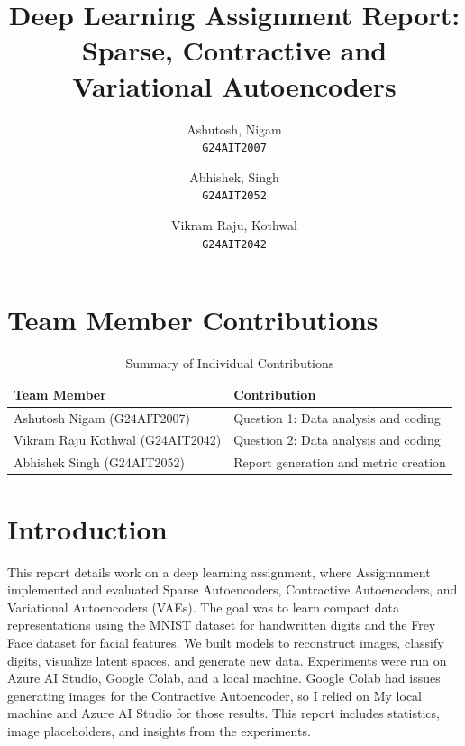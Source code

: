 \documentclass[12pt]{article}
\title{Deep Learning Assignment Report: Sparse, Contractive and Variational Autoencoders}
\author{
	Ashutosh, Nigam\\
	\texttt{G24AIT2007}
	\and
	Abhishek, Singh\\
	\texttt{G24AIT2052}
	\and
	Vikram Raju, Kothwal\\
	\texttt{G24AIT2042}
}
\date{}
\begin{document}
\newpage
\maketitle

\section*{Team Member Contributions}

\begin{table}[h!]
\centering
\begin{tabular}{@{}ll@{}}
\toprule
\textbf{Team Member} & \textbf{Contribution} \\
\midrule
Ashutosh Nigam (G24AIT2007) & Question 1: Data analysis and coding \\
Vikram Raju Kothwal (G24AIT2042) & Question 2: Data analysis and coding \\
Abhishek Singh (G24AIT2052) & Report generation and metric creation \\
\bottomrule
\end{tabular}
\caption{Summary of Individual Contributions}
\end{table}

	\section{Introduction}
	This report details  work on a deep learning assignment, where Assigmnment implemented and evaluated Sparse Autoencoders, Contractive Autoencoders, and Variational Autoencoders (VAEs). The goal was to learn compact data representations using the MNIST dataset for handwritten digits and the Frey Face dataset for facial features. We built models to reconstruct images, classify digits, visualize latent spaces, and generate new data. Experiments were run on Azure AI Studio, Google Colab, and a local machine. Google Colab had issues generating images for the Contractive Autoencoder, so I relied on My local machine and Azure AI Studio for those results. This report includes statistics, image placeholders, and insights from the experiments.
	
\end{document}
